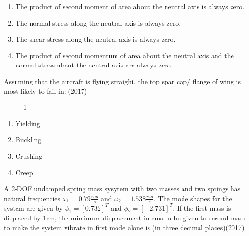     \begin{enumerate}[label=(\Alph*)]
        \item The product of second moment of area about the neutral axis is always zero.
        \item The normal stress along the neutral axis is always zero.
        \item The shear stress along the neutral axis is always zero.
        \item The product of second momentum of area about the neutral axis and the normal stress about the neutral axis are always zero.
    \end{enumerate}
    \item Assuming that the aircraft is flying straight, the top spar cap/ flange of wing is most likely to fail in: \hfill (2017)
    \begin{figure}[!ht]
        \centering
        \caption{1}
    \end{figure}
    \begin{enumerate}[label=(\Alph*)]
        \item  Yielding
        \item  Buckling 
        \item  Crushing
        \item  Creep
    \end{enumerate} 
    
    \item A 2-DOF undamped spring mass sysytem with two masses and two springs has natural frequencies $\omega_1 = 0.79\frac{rad}{s}$ and $\omega_2 = 1.538\frac{rad}{s}$. The mode shapes for the system are given by $\phi_1 = [0.732]^T$ and $\phi_2 = [-2.731]^T$. If the first mass is displaced by 1cm, the mimimum displacement in cms to be given to second mass to make the system vibrate in first mode alone is  (in three decimal places)\hfill (2017)
    
